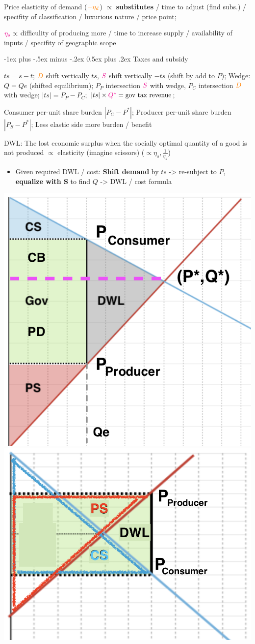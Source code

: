 \documentclass[a4paper]{article}
\makeatletter
\renewcommand{\section}{\@startsection{section}{1}{0mm}%
                                {-1ex plus -.5ex minus -.2ex}%
                                {0.5ex plus .2ex}%
                                {\normalfont\large\bfseries}}
\makeatother
\begin{document}
\begin{multicols*}{3}
        Price elasticity of demand ($\textcolor{orange}{-\eta_d}$) $\propto$ \textbf{substitutes} / time to adjust (find subs.) / specifity of classification / luxurious nature / price point;

    $\textcolor{magenta}{\eta_s}\propto$ difficulity of producing more / time to increase supply / availability of inputs / specifity of geographic scope

        \section{Taxes and subsidy}

    $ts=s-t$; $\textcolor{orange}{D}$ shift vertically $ts$, $\textcolor{magenta}{S}$ shift vertically $-ts$ (shift by add to $P$); Wedge: $Q=Qe$ (shifted equilibrium); $P_P$ intersection $\textcolor{magenta}{S}$ with wedge, $P_C$ intersection $\textcolor{orange}{D}$ with wedge; $|ts|=P_P-P_C$; $|ts|\times \textcolor{magenta}{Q^*}=\text{gov tax revenue}$;

        Consumer per-unit share burden $|P_C-P^*|$; Producer per-unit share burden $|P_S-P^*|$; Less elastic side more burden / benefit

        DWL: The lost economic surplus when the socially optimal quantity of a good is not produced $\propto$ elasticity (imagine scissors) ($\propto \eta_s, \frac{1}{\eta_d}$)


    \begin{itemize}
        \item Given required DWL / cost: \textbf{Shift demand} by $ts$ -> re-subject to $P$, \textbf{equalize with S} to find $Q$ -> DWL / cost formula
    \end{itemize}
    \begin{minipage}{\linewidth}
        \includegraphics[width=.48\linewidth]{./tax.png}
        \includegraphics[width=.48\linewidth]{./tax2.png}
    \end{minipage}


\end{multicols*}
\end{document}
